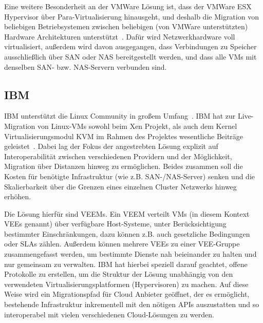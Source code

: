 Eine weitere Besonderheit an der VMWare Lösung ist, dass der VMWare
ESX Hypervisor über Para-Virtualisierung hinausgeht, und deshalb die
Migration von beliebigen Betriebsystemen zwischen beliebigen (von
VMWare unterstützten) Hardware Architekturen
unterstützt~\cite{nelson2005fast}. Dafür wird Netzwerkhardware voll
virtualisiert, außerdem wird davon ausgegangen, dass Verbindungen zu
Speicher ausschließlich über \ac{SAN} oder \ac{NAS} bereitgestellt
werden, und dass alle \acp{VM} mit denselben \ac{SAN}-
bzw. \ac{NAS}-Servern verbunden sind.

\subsection{IBM}
IBM unterstützt die Linux Community in großem
Umfang~\cite{kroahhartman2007linux}. IBM hat zur Live-Migration von
Linux-\acp{VM} sowohl beim Xen Projekt, als auch dem Kernel
Virtualisierungsmodul \ac{KVM} im Rahmen des \reservoir Projektes
wesentliche Beiträge geleistet~\cite{rochwerger2009reservoir}. Dabei
lag der Fokus der angestrebten Lösung explizit auf Interoperabilität
zwischen verschiedenen Providern und der Möglichkeit, Migration über
Distanzen hinweg zu ermöglichen. Beides zusammen soll die Kosten für
benötigte Infrastruktur (wie z.B. \ac{SAN}-/\ac{NAS}-Server) senken
und die Skalierbarkeit über die Grenzen eines einzelnen Cluster
Netzwerks hinweg erhöhen.

Die Lösung hierfür sind \acp{VEEM}. Ein \ac{VEEM} verteilt \acp{VM}
(in diesem Kontext \acp{VEE} genannt) über verfügbare Host-Systeme,
unter Berücksichtigung bestimmter Einschränkungen, dazu können
z.B. auch gesetzliche Bedingungen oder \acp{SLA} zählen. Außerdem
können mehrere \acp{VEE} zu einer \ac{VEE}-Gruppe zusammengefasst
werden, um bestimmte Dienste nah beieinander zu halten und nur
gemeinsam zu verwalten. IBM hat hierbei speziell darauf geachtet,
offene Protokolle zu erstellen, um die Struktur der Lösung unabhängig
von den verwendeten Virtualisierungsplatformen (\zB Hypervisoren) zu
machen. Auf diese Weise wird ein Migrationspfad für Cloud Anbieter
geöffnet, der es ermöglicht, bestehende Infrastruktur inkrementell mit
den nötigen \acp{API} auszustatten und so interoperabel mit vielen
verschiedenen Cloud-Lösungen zu werden.

